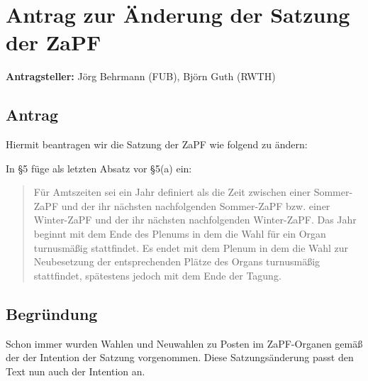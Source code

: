 \documentclass[draft,10pt,oneside]{scrartcl}
\begin{document}
\section*{Antrag zur Änderung der Satzung der ZaPF}

\textbf{Antragsteller:} Jörg Behrmann (FUB), Björn Guth (RWTH)

\subsection*{Antrag}

Hiermit beantragen wir die Satzung der ZaPF wie folgend zu
ändern:

In §5 füge als letzten Absatz vor §5(a) ein:
\begin{quote}
    Für Amtszeiten sei ein Jahr definiert als die Zeit zwischen einer Sommer-ZaPF
    und der ihr nächsten nachfolgenden Sommer-ZaPF bzw. einer Winter-ZaPF und der
    ihr nächsten nachfolgenden Winter-ZaPF.
    Das Jahr beginnt mit dem Ende des Plenums in dem die Wahl für ein Organ
    turnusmäßig stattfindet.
    Es endet mit dem Plenum in dem die Wahl zur Neubesetzung der entsprechenden
    Plätze des Organs turnusmäßig stattfindet, spätestens jedoch mit dem Ende der
    Tagung.
\end{quote}

\subsection*{Begründung}
Schon immer wurden Wahlen und Neuwahlen zu Posten im ZaPF-Organen gemäß der der
Intention der Satzung vorgenommen. Diese Satzungsänderung passt den Text nun
auch der Intention an.
\end{document}
